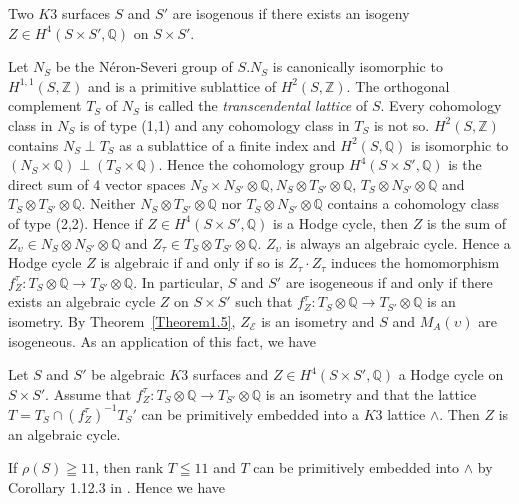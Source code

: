 \begin{dfn}\label{dfn1.8}
Two $K3$ surfaces $S$ and $S'$ are isogenous if there exists an
isogeny $Z\in H^{4}(S\times S',\mathbb{Q})$ on $S\times S'$. 

Let $N_S$ be the N\'{e}ron-Severi group of $S.N_S$ is canonically\pageoriginale
isomorphic to $H^{1,1}(S,\mathbb{Z})$ and is a primitive sublattice of
$H^{2}(S,\mathbb{Z})$. The orthogonal complement $T_S$ of $N_S$ is
called the \textit{transcendental lattice}  of $S$. Every cohomology
class in $N_S$ is of type (1,1) and any cohomology class in $T_S$ is
not so. $H^{2}(S,\mathbb{Z})$ contains $N_S\perp T_S$ as a sublattice
of a finite index and $H^{2}(S,\mathbb{Q})$ is isomorphic to
$(N_S\times \mathbb{Q})\perp (T_S\times \mathbb{Q})$. Hence the
cohomology group $H^{4}(S\times S',\mathbb{Q})$ is the direct sum of
$4$ vector spaces $N_S\times N_{S'}\otimes \mathbb{Q}, N_S\otimes
T_{S'}\otimes \mathbb{Q}$, $T_S\otimes N_{S'}\otimes \mathbb{Q}$ and
$T_S\otimes T_{S'}\otimes \mathbb{Q}$. Neither $N_S\otimes T_{S'}\otimes
\mathbb{Q}$ nor $T_S\otimes N_{S'}\otimes \mathbb{Q}$ contains a
cohomology class of type (2,2). Hence if $Z\in H^{4}(S\times
S',\mathbb{Q})$ is a Hodge cycle, then $Z$ is the sum of
$Z_{\upsilon}\in N_S\otimes N_{S'}\otimes \mathbb{Q}$ and $Z_{\tau}\in
T_S\otimes T_{S'}\otimes \mathbb{Q}$. $Z_{\upsilon}$ is always an
algebraic cycle. Hence a Hodge cycle $Z$ is algebraic if and only if
so is $Z_{\tau}\cdot Z_{\tau}$ induces the homomorphism
$f^{\tau}_Z:T_S\otimes \mathbb{Q}\to T_{S'}\otimes \mathbb{Q}$. In
particular, $S$ and $S'$ are isogeneous if and only if there exists an
algebraic cycle $Z$ on $S\times S'$ such that $f^{\tau}_Z:T_S\otimes
\mathbb{Q}\to T_{S'}\otimes \mathbb{Q}$ is an isometry. By
Theorem~\ref{Theorem1.5}, $Z_{\mathscr{E}}$ is an isometry and $S$ and
$M_A(\upsilon)$ are isogeneous. As an application of this fact, we
have 
\end{dfn}

\begin{Theorem}\label{Theorem1.9}
Let $S$ and $S'$ be algebraic $K3$ surfaces and $Z\in H^{4}(S\times
S',\mathbb{Q})$ a Hodge cycle on $S\times S'$. Assume that
$f^{\tau}_Z:T_S\otimes \mathbb{Q}\to T_{S'}\otimes \mathbb{Q}$ is an
isometry and that the lattice $T=T_S\cap(f^{\tau}_Z)^{-1}T_S'$ can be
primitively embedded into a $K3$ lattice $\wedge$. Then $Z$ is an
algebraic cycle.
\end{Theorem}

If $\rho(S)\geqq 11$, then rank $T\leqq 11$ and $T$ can be primitively
embedded into $\wedge$ by Corollary 1.12.3 in
\cite{key17}. Hence we have 



